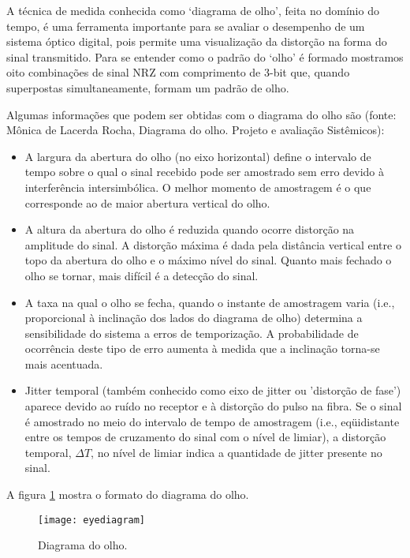 A técnica de medida conhecida como ‘diagrama de olho’, feita no domínio do tempo, é
uma ferramenta importante para se avaliar o desempenho de um sistema óptico digital, pois permite uma visualização da distorção na forma do sinal transmitido. Para se entender como o padrão do ‘olho’ é formado mostramos oito combinações de sinal NRZ com comprimento de 3-bit que, quando superpostas simultaneamente, formam um padrão de olho.

Algumas informações que podem ser obtidas com o diagrama do olho são (fonte: Mônica de Lacerda Rocha, Diagrama do olho. Projeto e avaliação Sistêmicos):

\begin{itemize}
    \item  A largura da abertura do olho (no eixo horizontal) define o intervalo de tempo sobre o qual o sinal recebido pode ser amostrado sem erro devido à interferência intersimbólica. O melhor momento de amostragem é o que corresponde ao de maior abertura vertical do olho.
    \item A altura da abertura do olho é reduzida quando ocorre distorção na amplitude do sinal. A distorção máxima é dada pela distância vertical entre o topo da abertura do olho e o
    máximo nível do sinal. Quanto mais fechado o olho se tornar, mais difícil é a detecção do sinal.

    \item A taxa na qual o olho se fecha, quando o instante de amostragem varia (i.e., proporcional à inclinação dos lados do diagrama de olho) determina a sensibilidade do sistema a erros de temporização. A probabilidade de ocorrência deste tipo de erro aumenta à medida que a inclinação torna-se mais acentuada.
    \item Jitter temporal (também conhecido como eixo de jitter ou 'distorção de fase') aparece devido ao ruído no receptor e à distorção do pulso na fibra. Se o sinal é amostrado no meio do intervalo de tempo de amostragem (i.e., eqüidistante entre os tempos de cruzamento do sinal com o nível de limiar), a distorção temporal, $\Delta T$, no nível de limiar indica a quantidade de jitter presente no sinal.
\end{itemize}

A figura \ref{fig:eyediagram} mostra o formato do diagrama do olho.

\begin{figure}[H]
    \centering
    \texttt{[image: eyediagram]}
    \caption{Diagrama do olho.}
    \label{fig:eyediagram}
\end{figure}